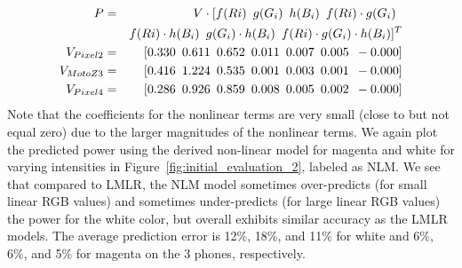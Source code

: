 \vspace{-0.1in}
{\small
  \begin{eqnarray}
  P&=&V\cdot [ 
	    f(Ri)\mbox{\hspace{0.07in}}
	    g(G_i)\mbox{\hspace{0.07in}}
	    h(B_i)\mbox{\hspace{0.07in}}
	    f(Ri)\cdot g(G_i)\mbox{\hspace{0.07in}}\\
&&	    f(Ri)\cdot h(B_i)\mbox{\hspace{0.07in}}
	    g(G_i)\cdot h(B_i)\mbox{\hspace{0.07in}}
	    f(Ri)\cdot g(G_i)\cdot h(B_i)
  ]^T
	\nonumber \\
        V_{Pixel 2} &=& \lbrack
	     0.330\mbox{\hspace{0.07in}}
	     0.611\mbox{\hspace{0.07in}}
	     0.652\mbox{\hspace{0.07in}}
	     0.011\mbox{\hspace{0.07in}}
	     0.007\mbox{\hspace{0.07in}}
	     0.005\mbox{\hspace{0.07in}}
	    -0.000
        \rbrack   \nonumber \\
        V_{Moto Z3} &=& \lbrack
	     0.416\mbox{\hspace{0.07in}}
	     1.224\mbox{\hspace{0.07in}}
	     0.535\mbox{\hspace{0.07in}}
	     0.001\mbox{\hspace{0.07in}}
	     0.003\mbox{\hspace{0.07in}}
	     0.001\mbox{\hspace{0.07in}}
	    -0.000
        \rbrack \nonumber  \\
        V_{Pixel 4} &=& \lbrack
	     0.286\mbox{\hspace{0.07in}}
	     0.926\mbox{\hspace{0.07in}}
	     0.859\mbox{\hspace{0.07in}}
	     0.008\mbox{\hspace{0.07in}}
	     0.005\mbox{\hspace{0.07in}}
	     0.002\mbox{\hspace{0.07in}}
	    -0.000
        \rbrack \nonumber 
\end{eqnarray}
}
\noindent
%
Note that the coefficients for the nonlinear terms are very small (close to but not equal zero)
due to the larger magnitudes of the nonlinear terms.
We again plot the predicted power using the derived non-linear model
for magenta and white for varying intensities in
Figure~\ref{fig:initial_evaluation_2}, labeled as NLM.
We see that compared to LMLR, the NLM model 
sometimes over-predicts (for small linear RGB values)
and sometimes under-predicts (for large linear RGB values) the power for the
white color, but overall exhibits similar accuracy as the
LMLR models.
{The average prediction error is
12\%, 18\%, and 11\% for white
and 6\%, 6\%, and 5\% for magenta on the 3 phones, respectively.
}

